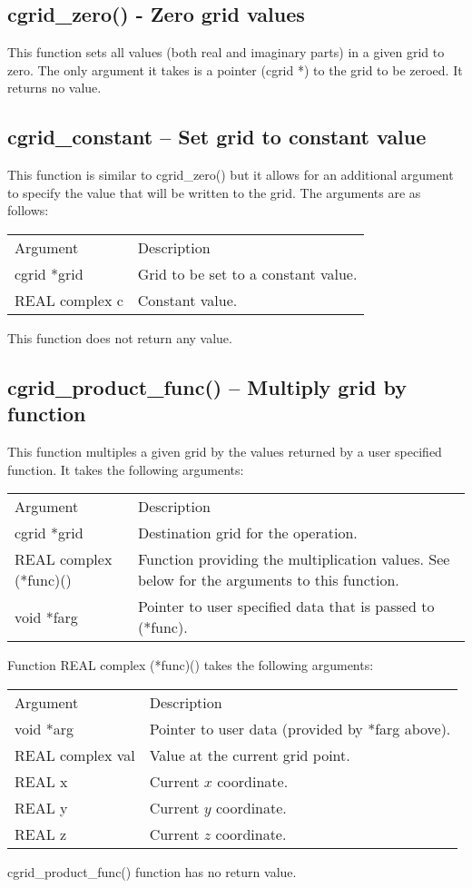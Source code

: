 \documentclass[12pt,letterpaper]{report}
\begin{document}
\subsection{cgrid\_zero() - Zero grid values}

This function sets all values (both real and imaginary parts) in a given grid to zero. The only argument it takes is a pointer (cgrid *) to the grid to be zeroed. It returns no value.

\subsection{cgrid\_constant -- Set grid to constant value}

This function is similar to cgrid\_zero() but it allows for an additional argument to specify the value that will be written to the grid. The arguments are as follows:
\begin{longtable}{p{} p{}}
Argument & Description\\
\cline{1-2}
cgrid *grid & Grid to be set to a constant value.\\
REAL complex c & Constant value.\\
\end{longtable}
\noindent
This function does not return any value.

\subsection{cgrid\_product\_func() -- Multiply grid by function}

This function multiples a given grid by the values returned by a user specified function. It takes the following arguments:
\begin{longtable}{p{} p{}}
Argument & Description\\
\cline{1-2}
cgrid *grid & Destination grid for the operation.\\
REAL complex (*func)() & Function providing the multiplication values. See below for the arguments to this function.\\
void *farg & Pointer to user specified data that is passed to (*func).\\   
\end{longtable}
\noindent
Function REAL complex (*func)() takes the following arguments:
\begin{longtable}{p{} p{}}
Argument & Description\\
\cline{1-2}
void *arg & Pointer to user data (provided by *farg above).\\
REAL complex val & Value at the current grid point.\\
REAL x & Current $x$ coordinate.\\
REAL y & Current $y$ coordinate.\\
REAL z & Current $z$ coordinate.\\
\end{longtable}
\noindent
cgrid\_product\_func() function has no return value.
\end{document}
